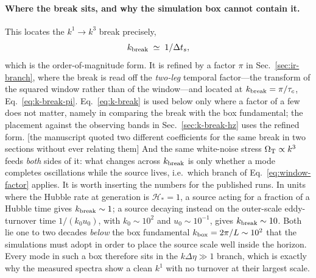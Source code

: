 \documentclass[10pt,prd,aps,nobibnotes,superscriptaddress,preprintnumbers,notitlepage]{revtex4-1}
\newcommand{\add}[1]{{\color{red}#1}}
\newcommand{\why}[1]{{\color{red}\footnotesize\textsf{[#1]}}}
\newcommand{\add}[1]{#1}
\newcommand{\why}[1]{}
\begin{document}
\paragraph{Where the break sits, and why the simulation box cannot contain it.}
This locates the $k^{1}\!\to\!k^{3}$ break precisely,
\begin{equation}
  k_{\rm break}\;\simeq\;1/\Delta t_{s},
  \label{eq:k-break}
\end{equation}
\add{which is the order-of-magnitude form. It is refined by a factor $\pi$ in
Sec.~\ref{sec:ir-branch}, where the break is read off the \emph{two-leg} temporal
factor---the transform of the squared window rather than of the window---and located at
$k_{\rm break}=\pi/\tau_c$, Eq.~\eqref{eq:k-break-pi}. Eq.~\eqref{eq:k-break} is used
below only where a factor of a few does not matter, namely in comparing the break with
the box fundamental; the placement against the observing bands in
Sec.~\ref{sec:k-break-hz} uses the refined form.}
\why{the manuscript quoted two different coefficients for the same break in two
sections without ever relating them}
And the same white-noise stress $\Omega_{\rm T}\propto k^{3}$ feeds \emph{both} sides of it:
what changes across $k_{\rm break}$ is only whether a mode completes oscillations while the
source lives, i.e.\ which branch of Eq.~\eqref{eq:window-factor} applies. It is worth
inserting the numbers for the published runs. In units where the Hubble rate at generation is
$\mathcal H_\ast=1$, a source acting for a fraction of a Hubble time gives
$k_{\rm break}\sim1$; a source decaying instead on the outer-scale eddy-turnover time
$1/(k_0u_0)$, with $k_0\sim10^2$ and $u_0\sim10^{-1}$, gives $k_{\rm break}\sim10$. Both lie
one to two decades \emph{below} the box fundamental $k_{\rm box}=2\pi/L\sim10^2$ that the simulations
must adopt in order to place the source scale well inside the horizon. Every mode in such a
box therefore sits in the $k\Delta\eta\gg1$ branch, which is exactly why the measured spectra
show a clean $k^{1}$ with no turnover at their largest scale.
\end{document}
